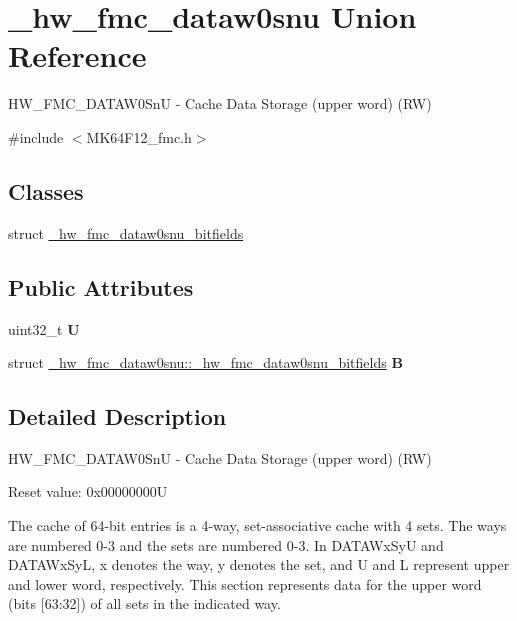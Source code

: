 \hypertarget{union__hw__fmc__dataw0snu}{}\section{\+\_\+hw\+\_\+fmc\+\_\+dataw0snu Union Reference}
\label{union__hw__fmc__dataw0snu}


H\+W\+\_\+\+F\+M\+C\+\_\+\+D\+A\+T\+A\+W0\+SnU -\/ Cache Data Storage (upper word) (RW)  




{\ttfamily \#include $<$M\+K64\+F12\+\_\+fmc.\+h$>$}

\subsection*{Classes}
\begin{DoxyCompactItemize}
\item 
struct \hyperlink{struct__hw__fmc__dataw0snu_1_1__hw__fmc__dataw0snu__bitfields}{\+\_\+hw\+\_\+fmc\+\_\+dataw0snu\+\_\+bitfields}
\end{DoxyCompactItemize}
\subsection*{Public Attributes}
\begin{DoxyCompactItemize}
\item 
uint32\+\_\+t {\bfseries U}\hypertarget{union__hw__fmc__dataw0snu_ae76a827529e7740801a2c94258530e22}{}\label{union__hw__fmc__dataw0snu_ae76a827529e7740801a2c94258530e22}

\item 
struct \hyperlink{struct__hw__fmc__dataw0snu_1_1__hw__fmc__dataw0snu__bitfields}{\+\_\+hw\+\_\+fmc\+\_\+dataw0snu\+::\+\_\+hw\+\_\+fmc\+\_\+dataw0snu\+\_\+bitfields} {\bfseries B}\hypertarget{union__hw__fmc__dataw0snu_a08a72841afaa185c941355d5cce78c42}{}\label{union__hw__fmc__dataw0snu_a08a72841afaa185c941355d5cce78c42}

\end{DoxyCompactItemize}


\subsection{Detailed Description}
H\+W\+\_\+\+F\+M\+C\+\_\+\+D\+A\+T\+A\+W0\+SnU -\/ Cache Data Storage (upper word) (RW) 

Reset value\+: 0x00000000U

The cache of 64-\/bit entries is a 4-\/way, set-\/associative cache with 4 sets. The ways are numbered 0-\/3 and the sets are numbered 0-\/3. In D\+A\+T\+A\+Wx\+SyU and D\+A\+T\+A\+Wx\+SyL, x denotes the way, y denotes the set, and U and L represent upper and lower word, respectively. This section represents data for the upper word (bits \mbox{[}63\+:32\mbox{]}) of all sets in the indicated way. 

